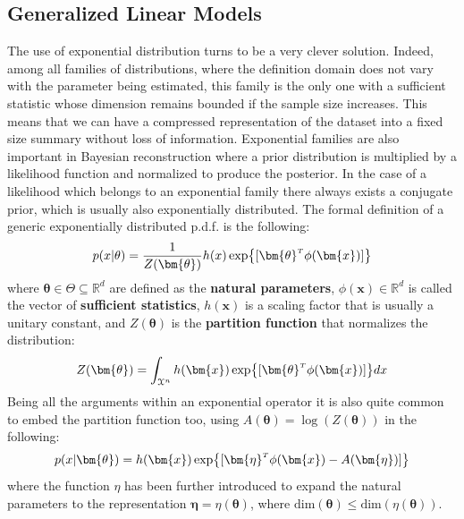%
\subsection{Generalized Linear Models}
The use of exponential distribution turns to be a very clever solution. Indeed, among all families of distributions, where the definition domain does not vary with the parameter being estimated, this family is the only one with a sufficient statistic whose dimension remains bounded if the sample size increases. This means that we can have a compressed representation of the dataset into a fixed size summary without loss of information.
Exponential families are also important in Bayesian reconstruction where a prior distribution is multiplied by a likelihood function and normalized to produce the posterior. In the case of a likelihood which belongs to an exponential family there always exists a conjugate prior, which is usually also exponentially distributed. 
%
The formal definition of a generic exponentially distributed p.d.f. is the following:
\begin{equation}
    p(x|\theta) = \frac{1}{Z(\bm{\theta})}h(x) \exp{[\transpose{\bm{\theta}} \phi(\bm{x})]}
\end{equation}
where $\bm{\theta} \in \Theta \subseteq \mathbb{R}^d$ are defined as the \textbf{natural parameters}, $\phi(\bm{x}) \in \mathbb{R}^d$ is called the vector of \textbf{sufficient statistics}, $h(\bm{x})$ is a scaling factor that is usually a unitary constant, and $Z(\bm{\theta})$ is the \textbf{partition function} that normalizes the distribution:
\begin{equation}
    Z(\bm{\theta}) = 
    \int_{\mathcal{X}^n} h(\bm{x}) \exp{[\transpose{\bm{\theta}} \phi(\bm{x})]} dx
\end{equation}
Being all the arguments within an exponential operator it is also quite common to embed the partition function too, using $ A(\bm{\theta}) = \log\left(Z(\bm{\theta})\right)$ in the following:
\begin{equation}
    p(x|\bm{\theta}) = h(\bm{x}) \exp{[\transpose{\bm{\eta}}\phi(\bm{x}) - A(\bm{\eta}) ]}
\end{equation}
where the function $\eta$ has been further introduced to expand the natural parameters to the representation $\bm{\eta}=\eta(\bm{\theta})$, where $\text{dim}(\bm{\theta}) \leq \text{dim}\left(\eta(\bm{\theta})\right)$.

